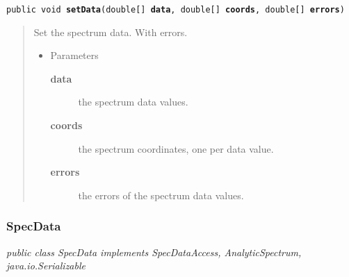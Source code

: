 \documentclass[twoside,11pt,nolof]{starlink}
\providecommand{\startsection}[4]{
   \subsubsection{\label{#3}{#2}}
   #4
}
\providecommand{\method}[1]{\texttt{#1}}
\newenvironment{desc}{\begin{quote}}{\end{quote}}
\begin{document}
\method{public void \textbf{setData}(\texttt{double[]} \textbf{data}, \texttt{double[]} \textbf{coords}, \texttt{double[]} \textbf{errors})\label{l25}\label{l26}}
\begin{desc}Set the spectrum data. With errors.
\begin{itemize}
\item{Parameters
  \begin{description}
   \item[\textbf{data}]{the spectrum data values.}
   \item[\textbf{coords}]{the spectrum coordinates, one per data value.}
   \item[\textbf{errors}]{the errors of the spectrum data values.}
  \end{description}}
\end{itemize}
\end{desc}

\startsection{Class}{SpecData}{l1}

\fbox{\parbox{\textwidth}{
\textit{public
 class SpecData implements SpecDataAccess, AnalyticSpectrum, java.io.Serializable}
}} %



\end{document}
